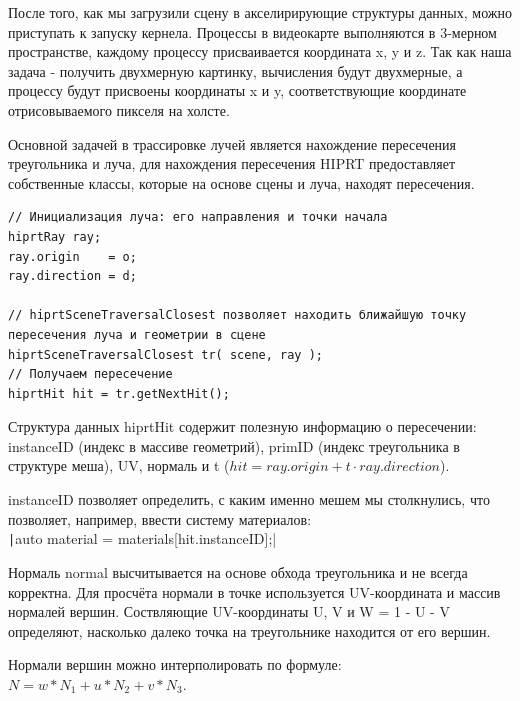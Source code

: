 \documentclass[a4paper,14pt]{extarticle}
\begin{document}
После того, как мы загрузили сцену в акселирирующие структуры данных, можно приступать к запуску кернела. 
Процессы в видеокарте выполняются в 3-мерном пространстве, каждому процессу присваивается координата x, y и z. 
Так как наша задача - получить двухмерную картинку, вычисления будут двухмерные, а 
процессу будут присвоены координаты x и y, соответствующие координате отрисовываемого пикселя на холсте.

Основной задачей в трассировке лучей является нахождение пересечения треугольника и луча, для нахождения 
пересечения HIPRT предоставляет собственные классы, которые на основе сцены и луча, находят пересечения. 
\begin{verbatim}
// Инициализация луча: его направления и точки начала
hiprtRay ray;
ray.origin	  = o;
ray.direction = d;

// hiprtSceneTraversalClosest позволяет находить ближайшую точку пересечения луча и геометрии в сцене
hiprtSceneTraversalClosest tr( scene, ray );
// Получаем пересечение
hiprtHit hit = tr.getNextHit();
\end{verbatim} 

Структура данных hiprtHit содержит полезную информацию о пересечении: instanceID (индекс в массиве геометрий), 
primID (индекс треугольника в структуре меша), UV, нормаль и t ($hit = ray.origin + t \cdot ray.direction$).

instanceID позволяет определить, с каким именно мешем мы столкнулись, что позволяет, например, ввести систему материалов:\\
\texttt|auto material = materials[hit.instanceID];|

Нормаль normal высчитывается на основе обхода треугольника и не всегда корректна. Для просчёта нормали в точке
используется UV-координата и массив нормалей вершин. Соствляющие UV-координаты U, V и W = 1 - U - V определяют, 
насколько далеко точка на треугольнике находится от его вершин. 

Нормали вершин можно интерполировать по формуле: $N = w * N_1 + u * N_2 + v * N_3$.
\end{document}
